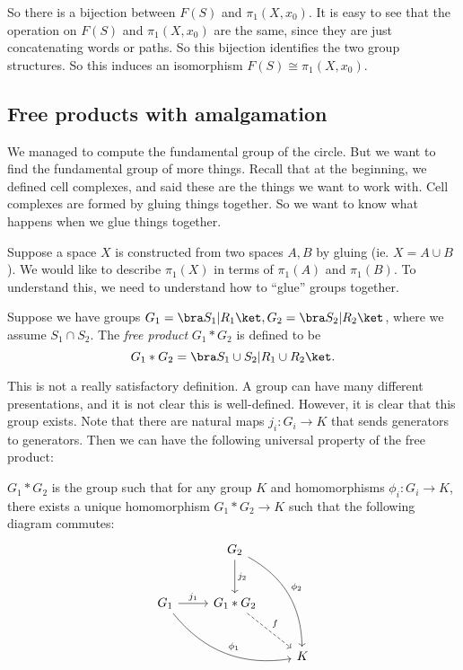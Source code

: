 \documentclass[a4paper]{article}
\begin{document}
So there is a bijection between $F(S)$ and $\pi_1(X, x_0)$. It is easy to see that the operation on $F(S)$ and $\pi_1(X, x_0)$ are the same, since they are just concatenating words or paths. So this bijection identifies the two group structures. So this induces an isomorphism $F(S)\cong \pi_1(X, x_0)$.

\subsection{Free products with amalgamation}
We managed to compute the fundamental group of the circle. But we want to find the fundamental group of more things. Recall that at the beginning, we defined cell complexes, and said these are the things we want to work with. Cell complexes are formed by gluing things together. So we want to know what happens when we glue things together.

Suppose a space $X$ is constructed from two spaces $A, B$ by gluing (ie. $X = A\cup B$). We would like to describe $\pi_1(X)$ in terms of $\pi_1(A)$ and $\pi_1(B)$. To understand this, we need to understand how to ``glue'' groups together.

\begin{defi}
  Suppose we have groups $G_1 = \bra S_1 | R_1\ket, G_2 = \bra S_2 | R_2\ket$, where we assume $S_1 \cap S_2$. The \emph{free product} $G_1 * G_2$ is defined to be
  \[
    G_1 * G_2 = \bra S_1 \cup S_2 | R_1 \cup R_2\ket.
  \]
\end{defi}
This is not a really satisfactory definition. A group can have many different presentations, and it is not clear this is well-defined. However, it is clear that this group exists. Note that there are natural maps $j_i: G_i \to K$ that sends generators to generators. Then we can have the following universal property of the free product:

\begin{lemma}
  $G_1 * G_2$ is the group such that for any group $K$ and homomorphisms $\phi_i: G_i \to K$, there exists a unique homomorphism $G_1 * G_2 \to K$ such that the following diagram commutes:
  \[
    \begin{tikzcd}[row sep=large]
      & G_2 \ar[rdd, bend left, "\phi_2"] \ar[d, "j_2"]\\
      G_1 \ar[rrd, bend right, "\phi_1"] \ar [r, "j_1"] & G_1 * G_2 \ar [rd, dashed, "f"]\\
      && K
    \end{tikzcd}
  \]
\end{lemma}
\end{document}
